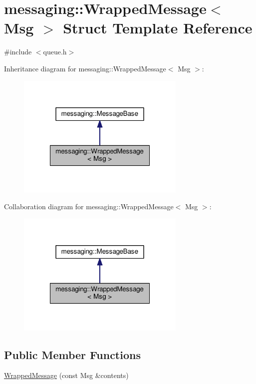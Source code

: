 \hypertarget{structmessaging_1_1WrappedMessage}{\section{messaging\-:\-:Wrapped\-Message$<$ Msg $>$ Struct Template Reference}
\label{structmessaging_1_1WrappedMessage}
}


{\ttfamily \#include $<$queue.\-h$>$}



Inheritance diagram for messaging\-:\-:Wrapped\-Message$<$ Msg $>$\-:\nopagebreak
\begin{figure}[H]
\begin{center}
\leavevmode
\includegraphics[width=228pt]{structmessaging_1_1WrappedMessage__inherit__graph}
\end{center}
\end{figure}


Collaboration diagram for messaging\-:\-:Wrapped\-Message$<$ Msg $>$\-:\nopagebreak
\begin{figure}[H]
\begin{center}
\leavevmode
\includegraphics[width=228pt]{structmessaging_1_1WrappedMessage__coll__graph}
\end{center}
\end{figure}
\subsection*{Public Member Functions}
\begin{DoxyCompactItemize}
\item 
\hyperlink{structmessaging_1_1WrappedMessage_a1c4326bb674fcb8c82e77554618d4c46}{Wrapped\-Message} (const Msg \&contents)
\end{DoxyCompactItemize}
